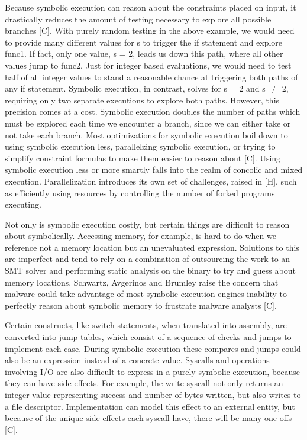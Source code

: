 \documentclass[11pt,expanded,copyright]{fsuthesis}
\begin{document}
Because symbolic execution can reason about the constraints placed on input, it drastically reduces the amount of testing necessary to explore all possible branches [C]. With purely random testing in the above example, we would need to provide many different values for s to trigger the if statement and explore func1. If fact, only one value, s = 2, leads us down this path, where all other values jump to func2. Just for integer based evaluations, we would need to test half of all integer values to stand a reasonable chance at triggering both paths of any if statement. Symbolic execution, in contrast, solves for s = 2 and s $\neq$ 2, requiring only two separate executions to explore both paths. However, this precision comes at a cost. Symbolic execution doubles the number of paths which must be explored each time we encounter a  branch, since we can either take or not take each branch. Most optimizations for symbolic execution boil down to using symbolic execution less, parallelzing symbolic execution, or trying to simplify constraint formulas to make them easier to reason about [C]. Using symbolic execution less or more smartly falls into the realm of concolic and mixed execution. Parallelization introduces its own set of challenges, raised in [H], such as efficiently using resources by controlling the number of forked programs executing.

Not only is symbolic execution costly, but certain things are difficult to reason about symbolically. Accessing memory, for example, is hard to do when we reference not a memory location but an unevaluated expression. Solutions to this are imperfect and tend to rely on a combination of outsourcing the work to an SMT solver and performing static analysis on the binary to try and guess about memory locations. Schwartz, Avgerinos and Brumley raise the concern that malware could take advantage of most symbolic execution engines inability to perfectly reason about symbolic memory to frustrate malware analysts [C].

Certain constructs, like switch statements, when translated into assembly, are converted into jump tables, which consist of a sequence of checks and jumps to implement each case. During symbolic execution these compares and jumps could also be an expression instead of a concrete value. Syscalls and operations involving I/O are also difficult to express in a purely symbolic execution, because they can have side effects. For example, the write syscall not only returns an integer value representing success and number of bytes written, but also writes to a file descriptor. Implementation can model this effect to an external entity, but because of the unique side effects each syscall have, there will be many one-offs [C]. 
\end{document}
